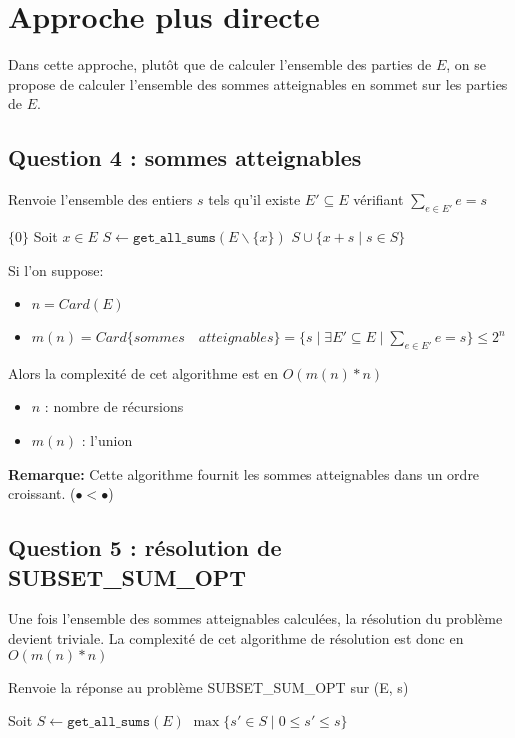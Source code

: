 \documentclass[10pt]{article}
\let\oldReturn\Return
\renewcommand{\Return}{\State\oldReturn}
\begin{document}
	\newpage
	\section{Approche plus directe}\label{approche_plus_directe}
		Dans cette approche, plutôt que de calculer l'ensemble des parties de $E$,
		on se propose de calculer l'ensemble des sommes atteignables en sommet sur les parties de $E$.
		
		\subsection{Question 4 : sommes atteignables}\label{get_all_sums}
			\begin{algorithm}
				\caption{Renvoie l'ensemble des entiers $s$ tels qu'il existe $E' \subseteq E$ vérifiant $\sum\limits_{e \in E'}e = s$}
				\begin{algorithmic}[1]
							\Return $\{0\}$
						\EndIf
						\State Soit $x \in E$
						\State $S \leftarrow \mathtt{get\_all\_sums}(E \backslash \{x\})$
						\Return $S \cup \{x + s \mid s \in S\}$
					\EndFunction
				\end{algorithmic}
			\end{algorithm}
			Si l'on suppose:
			\begin{itemize}[label=-]
				\setlength\itemsep{0.1em}
				\item $n = Card(E)$
				\item $m(n) = Card\{sommes \quad atteignables\} = \{s \mid \exists E' \subseteq E \mid \sum\limits_{e \in E'}e = s\} \leq 2^n$
			\end{itemize}
			Alors la complexité de cet algorithme est en $\boxed{O(m(n) * n)}$
			\begin{itemize}[label=-]
				\setlength\itemsep{0.1em}
				\item $n$ : nombre de récursions
				\item $m(n)$ : l'union
			\end{itemize}
			\textbf{Remarque:} Cette algorithme fournit les sommes atteignables dans un ordre croissant. ($\bullet < \bullet$)

		\subsection{Question 5 : résolution de SUBSET\_SUM\_OPT}
			Une fois l'ensemble des sommes atteignables calculées, la résolution du problème devient triviale.
			La complexité de cet algorithme de résolution est donc en $\boxed{O(m(n) * n)}$
			\begin{algorithm}
				\caption{Renvoie la réponse au problème SUBSET\_SUM\_OPT sur (E, s)}
				\begin{algorithmic}[1]
					\Function{subset\_sum}{$E \subset \mathbb{N}, s \in \mathbb{N}$}
						\State Soit $S \leftarrow \mathtt{get\_all\_sums}(E)$
						\Return $\max\{s' \in S \mid 0 \leq s' \leq s\}$
					\EndFunction
				\end{algorithmic}
			\end{algorithm}
\end{document}
